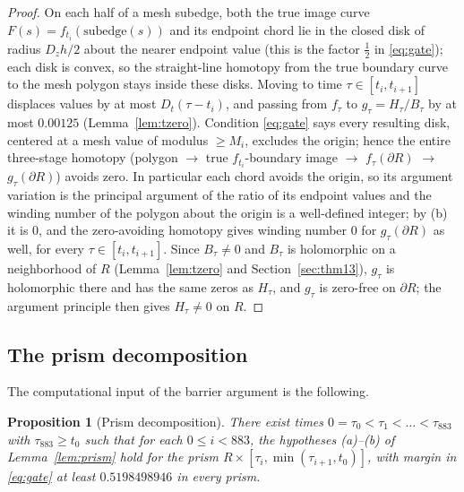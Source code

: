 \documentclass[11pt]{article}
\newtheorem{proposition}[theorem]{Proposition}
\theoremstyle{definition}
\begin{document}
\begin{proof}
On each half of a mesh subedge, both the true image curve
$F(s)=f_{t_i}(\text{subedge}(s))$ and its endpoint chord lie in the
closed disk of radius $D_{z}h/2$ about the nearer endpoint value
(this is the factor $\frac12$ in \eqref{eq:gate}); each disk is
convex, so the straight-line homotopy from the true boundary curve
to the mesh polygon stays inside these disks. Moving to time
$\tau\in[t_i,t_{i+1}]$ displaces values by at most
$D_{t}(\tau-t_i)$, and passing from $f_\tau$ to
$g_\tau=H_\tau/B_\tau$ by at most $0.00125$
(Lemma~\ref{lem:tzero}). Condition \eqref{eq:gate} says every
resulting disk, centered at a mesh value of modulus $\ge M_i$,
excludes the origin; hence the entire three-stage homotopy (polygon
$\to$ true $f_{t_i}$-boundary image $\to$ $f_\tau(\partial R)$ $\to$
$g_\tau(\partial R)$) avoids zero. In particular each chord avoids
the origin, so its argument variation is the principal argument of
the ratio of its endpoint values and the winding number of the
polygon about the origin is a well-defined integer; by (b) it is
$0$, and the zero-avoiding homotopy gives winding number $0$ for
$g_\tau(\partial R)$ as well, for every $\tau\in[t_i,t_{i+1}]$.
Since $B_\tau\neq0$ and $B_\tau$ is holomorphic on a neighborhood
of $R$ (Lemma~\ref{lem:tzero} and Section~\ref{sec:thm13}),
$g_\tau$ is holomorphic there and has the same zeros as $H_\tau$,
and $g_\tau$ is zero-free on $\partial R$; the argument principle
then gives $H_\tau\neq0$ on $R$.
\end{proof}

\subsection{The prism decomposition}\label{sec:prismcert}

The computational input of the barrier argument is the following.

\begin{proposition}[Prism decomposition]\label{prop:prismcert}
There exist times $0=\tau_0<\tau_1<\dots<\tau_{883}$ with
$\tau_{883}\ge t_0$ such that for each $0\le i<883$, the
hypotheses (a)--(b) of Lemma~\ref{lem:prism} hold for the prism
$R\times[\tau_i,\min(\tau_{i+1},t_0)]$, with margin in
\eqref{eq:gate} at least $0.5198498946$ in every prism.
\end{proposition}
\end{document}
